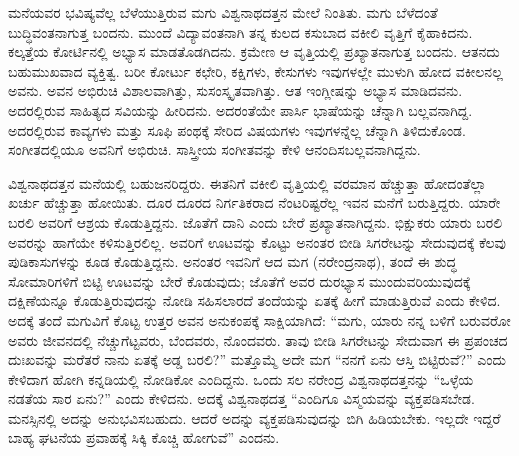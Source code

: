 ಮನೆಯವರ ಭವಿಷ್ಯವೆಲ್ಲ ಬೆಳೆಯುತ್ತಿರುವ ಮಗು ವಿಶ್ವನಾಥದತ್ತನ ಮೇಲೆ ನಿಂತಿತು. ಮಗು ಬೆಳೆದಂತೆ ಬುದ್ಧಿವಂತನಾಗುತ್ತ ಬಂದನು. ಮುಂದೆ ವಿದ್ಯಾವಂತನಾಗಿ ತನ್ನ ಕುಲದ ಕಸುಬಾದ ವಕೀಲಿ ವೃತ್ತಿಗೆ ಕೈಹಾಕಿದನು. ಕಲ್ಕತ್ತೆಯ ಕೋರ್ಟಿನಲ್ಲಿ ಅಭ್ಯಾಸ ಮಾಡತೊಡಗಿದನು. ಕ್ರಮೇಣ ಆ ವೃತ್ತಿಯಲ್ಲಿ ಪ್ರಖ್ಯಾತನಾಗುತ್ತ ಬಂದನು. ಆತನದು ಬಹುಮುಖವಾದ ವ್ಯಕ್ತಿತ್ವ. ಬರೀ ಕೋರ್ಟು ಕಛೇರಿ, ಕಕ್ಷಿಗಳು, ಕೇಸುಗಳು ಇವುಗಳಲ್ಲೇ ಮುಳುಗಿ ಹೋದ ವಕೀಲನಲ್ಲ ಅವನು. ಅವನ ಅಭಿರುಚಿ ವಿಶಾಲವಾಗಿತ್ತು, ಸುಸಂಸ್ಕೃತವಾಗಿತ್ತು. ಆತ ಇಂಗ್ಲೀಷನ್ನು ಅಭ್ಯಾಸ ಮಾಡಿದವನು. ಅದರಲ್ಲಿರುವ ಸಾಹಿತ್ಯದ ಸವಿಯನ್ನು ಹೀರಿದನು. ಅದರಂತೆಯೇ ಪಾರ್ಸಿ ಭಾಷೆಯನ್ನು ಚೆನ್ನಾಗಿ ಬಲ್ಲವನಾಗಿದ್ದ. ಅದರಲ್ಲಿರುವ ಕಾವ್ಯಗಳು ಮತ್ತು ಸೂಫಿ ಪಂಥಕ್ಕೆ ಸೇರಿದ ವಿಷಯಗಳು ಇವುಗಳನ್ನೆಲ್ಲ ಚೆನ್ನಾಗಿ ತಿಳಿದುಕೊಂಡ. ಸಂಗೀತದಲ್ಲಿಯೂ ಅವನಿಗೆ ಅಭಿರುಚಿ. ಸಾಸ್ತ್ರೀಯ ಸಂಗೀತವನ್ನು ಕೇಳಿ ಆನಂದಿಸಬಲ್ಲವನಾಗಿದ್ದನು. 

ವಿಶ್ವನಾಥದತ್ತನ ಮನೆಯಲ್ಲಿ ಬಹುಜನರಿದ್ದರು. ಈತನಿಗೆ ವಕೀಲಿ ವೃತ್ತಿಯಲ್ಲಿ ವರಮಾನ ಹೆಚ್ಚುತ್ತಾ ಹೋದಂತೆಲ್ಲಾ ಖರ್ಚು ಹೆಚ್ಚುತ್ತಾ ಹೋಯಿತು. ದೂರ ದೂರದ ನಿರ್ಗತಿಕರಾದ ನೆಂಟರಿಷ್ಟರೆಲ್ಲ ಇವನ ಮನೆಗೆ ಬರುತ್ತಿದ್ದರು. ಯಾರೇ ಬರಲಿ ಅವರಿಗೆ ಆಶ್ರಯ ಕೊಡುತ್ತಿದ್ದನು. ಜೊತೆಗೆ ದಾನಿ ಎಂದು ಬೇರೆ ಪ್ರಖ್ಯಾತನಾಗಿದ್ದನು. ಭಿಕ್ಷುಕರು ಯಾರು ಬರಲಿ ಅವರನ್ನು ಹಾಗೆಯೇ ಕಳಿಸುತ್ತಿರಲಿಲ್ಲ. ಅವರಿಗೆ ಊಟವನ್ನು ಕೊಟ್ಟು ಅನಂತರ ಬೀಡಿ ಸಿಗರೇಟನ್ನು ಸೇದುವುದಕ್ಕೆ ಕೆಲವು ಪುಡಿಕಾಸುಗಳನ್ನು ಕೂಡ ಕೊಡುತ್ತಿದ್ದನು. ಅನಂತರ ಇವನಿಗೆ ಆದ ಮಗ (ನರೇಂದ್ರನಾಥ), ತಂದೆ ಈ ಶುದ್ಧ ಸೋಮಾರಿಗಳಿಗೆ ಬಿಟ್ಟಿ ಊಟವನ್ನು ಬೇರೆ ಕೊಡುವುದು; ಜೊತೆಗೆ ಅವರ ದುರಭ್ಯಾಸ ಮುಂದುವರಿಯುವುದಕ್ಕೆ ದಕ್ಷಿಣೆಯನ್ನೂ ಕೊಡುತ್ತಿರುವುದನ್ನು ನೋಡಿ ಸಹಿಸಲಾರದೆ ತಂದೆಯನ್ನು ಏತಕ್ಕೆ ಹೀಗೆ ಮಾಡುತ್ತಿರುವೆ ಎಂದು ಕೇಳಿದ. ಅದಕ್ಕೆ ತಂದೆ ಮಗುವಿಗೆ ಕೊಟ್ಟ ಉತ್ತರ ಅವನ ಅನುಕಂಪಕ್ಕೆ ಸಾಕ್ಷಿಯಾಗಿದೆ: “ಮಗು, ಯಾರು ನನ್ನ ಬಳಿಗೆ ಬರುವರೋ ಅವರು ಜೀವನದಲ್ಲಿ ನೆಚ್ಚುಗೆಟ್ಟವರು, ಬೆಂದವರು, ನೊಂದವರು. ತಾವು ಬೀಡಿ ಸಿಗರೇಟನ್ನು ಸೇದುವಾಗ ಈ ಪ್ರಪಂಚದ ದುಃಖವನ್ನು ಮರೆತರೆ ನಾನು ಏತಕ್ಕೆ ಅಡ್ಡ ಬರಲಿ?” ಮತ್ತೊಮ್ಮೆ ಅದೇ ಮಗ “ನನಗೆ ಏನು ಆಸ್ತಿ ಬಿಟ್ಟಿರುವೆ?” ಎಂದು ಕೇಳಿದಾಗ ಹೋಗಿ ಕನ್ನಡಿಯಲ್ಲಿ ನೋಡಿಕೋ ಎಂದಿದ್ದನು. ಒಂದು ಸಲ ನರೇಂದ್ರ ವಿಶ್ವನಾಥದತ್ತನನ್ನು “ಒಳ್ಳೆಯ ನಡತೆಯ ಸಾರ ಏನು?” ಎಂದು ಕೇಳಿದನು. ಅದಕ್ಕೆ ವಿಶ್ವನಾಥದತ್ತ “ಎಂದಿಗೂ ವಿಸ್ಮಯವನ್ನು ವ್ಯಕ್ತಪಡಿಸಬೇಡ. ಮನಸ್ಸಿನಲ್ಲಿ ಅದನ್ನು ಅನುಭವಿಸಬಹುದು. ಆದರೆ ಅದನ್ನು ವ್ಯಕ್ತಪಡಿಸುವುದನ್ನು ಬಿಗಿ ಹಿಡಿಯಬೇಕು. ಇಲ್ಲದೇ ಇದ್ದರೆ ಬಾಹ್ಯ ಘಟನೆಯ ಪ್ರವಾಹಕ್ಕೆ ಸಿಕ್ಕಿ ಕೊಚ್ಚಿ ಹೋಗುವೆ” ಎಂದನು.

